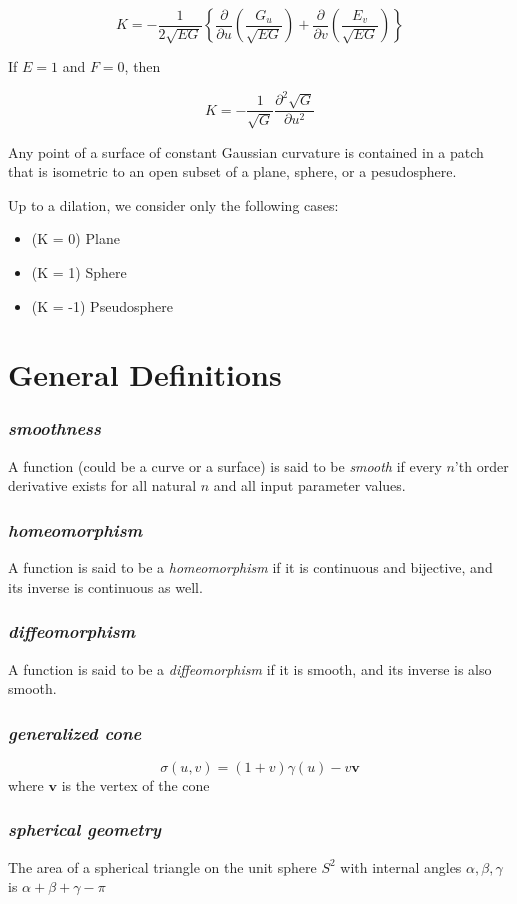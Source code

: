 \documentclass[12pt]{article}
\begin{document}
\begin{multicols*}{2}
\[K = -\frac{1}{2\sqrt{EG}}\left\{\frac{\partial}{\partial u}\left(\frac{G_u}{\sqrt{EG}}\right) + \frac{\partial}{\partial v}\left(\frac{E_v}{\sqrt{EG}}\right)\right\}\]

If $E=1$ and $F=0$, then 

\[K = -\frac{1}{\sqrt{G}}\frac{\partial^2\sqrt{G}}{\partial u^2}\]

Any point of a surface of constant Gaussian curvature is contained in a patch that is isometric to an open subset of a plane, sphere, or a pesudosphere.

Up to a dilation, we consider only the following cases:
\begin{itemize}
    \item (K = 0) Plane
    \item (K = 1) Sphere
    \item (K = -1) Pseudosphere
\end{itemize}

\section*{General Definitions}

\subsubsection*{\textit{smoothness}}

A function (could be a curve or a surface) is said to be \textit{smooth} if every $n$'th order derivative exists for all natural $n$ and all input parameter values.

\subsubsection*{\textit{homeomorphism}}

A function is said to be a \textit{homeomorphism} if it is continuous and bijective, and its inverse is continuous as well.

\subsubsection*{\textit{diffeomorphism}}

A function is said to be a \textit{diffeomorphism} if it is smooth, and its inverse is also smooth.

\subsubsection*{\textit{generalized cone}}

\[\sigma(u, v) = (1 + v)\gamma(u) - v\mathbf{v}\] where $\mathbf{v}$ is the vertex of the cone

\subsubsection*{\textit{spherical geometry}}

The area of a spherical triangle on the unit sphere $S^2$ with internal angles $\alpha, \beta, \gamma$ is $\alpha + \beta + \gamma - \pi$

\end{multicols*}
\end{document}
